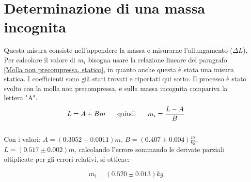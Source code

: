 \documentclass[12pt, a4paper]{article}
\begin{document}
\section{Determinazione di una massa incognita}
Questa misura consiste nell'appendere la massa e misurarne l'allungamento ($\Delta L$). Per calcolare il valore di $m_i$ bisogna usare la relazione lineare del paragrafo \ref{Molla non precompressa, statico}, in quanto anche questa è stata una misura statica. I coefficienti sono già stati trovati e riportati qui sotto. 
Il processo è stato svolto con la molla non precompressa, e sulla massa incognita compariva la lettera "A".
\begin{equation}
    L = A + Bm  \mbox{\hspace{0.5cm} quindi \hspace{0.5cm}}  m_i = \frac{L - A}{B}
\end{equation}\\
Con i valori: $A = (0.3052 \pm 0.0011)m$, $B = (0.407 \pm 0.004)\frac{m}{kg}$, $L = (0.517 \pm 0.002)m$, calcolando l'errore sommando le derivate parziali oltiplicate per gli errori relativi, si ottiene: 

\begin{equation} 
    m_i = (0.520 \pm 0.013)kg 
\end{equation}
\end{document}
